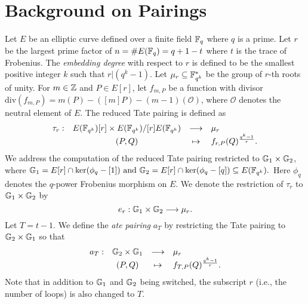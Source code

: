 \section{Background on Pairings}
\label{sec:background}

Let $E$ be an elliptic curve defined over a finite field $\mathbb{F}_{q}$ where $q$ is a prime.
Let $r$ be the largest prime factor of $n = \#E(\mathbb{F}_{q}) = q + 1 - t$ where $t$ is the trace of Frobenius.
The \emph{embedding degree} with respect to $r$ is defined to be the smallest positive integer $k$ such that $r | (q^k-1)$.
Let $\mu_{r} \subseteq \mathbb{F}_{q^{k}}^{*}$ be the group of $r$-th roots of unity.
For $m \in \mathbb{Z}$ and $P \in E[r]$,
let $f_{m,P}$ be a function with divisor 
$\text{div}(f_{m,P}) = m(P) - ([m]P) - (m-1)(\mathcal{O})$,
where $\mathcal{O}$ denotes the neutral element of $E$.
The reduced Tate pairing is defined as
\[\begin{array}{rccl}
\tau_{r} :	& E(\mathbb{F}_{q^{k}})[r] \times E(\mathbb{F}_{q^{k}})/[r]E(\mathbb{F}_{q^{k}})	& \longrightarrow	& \mu_{r} \\
		& (P,Q)								& \mapsto		& f_{r,P}(Q)^{\frac{q^{k}-1}{r}}.
\end{array}\]
We address the computation of the reduced Tate pairing restricted to $\mathbb{G}_{1} \times \mathbb{G}_{2}$, where
$\mathbb{G}_{1} = E[r] \cap \ker(\phi_{q}-[1]) \text{ and }
\mathbb{G}_{2} = E[r] \cap \ker(\phi_{q} - [q]) \subseteq E(\mathbb{F}_{q^{k}}).$
Here $\phi_{q}$ denotes the $q$-power Frobenius morphism on $E$.
We denote the restriction of $\tau_{r}$ to $\mathbb{G}_{1} \times \mathbb{G}_{2}$ by
$$e_{r} : \mathbb{G}_{1} \times \mathbb{G}_{2} \longrightarrow \mu_{r}.$$
Let $T = t-1$.
We define the \emph{ate pairing} $a_{T}$ by restricting the Tate pairing to $\mathbb{G}_{2} \times \mathbb{G}_{1}$ so that
\[\begin{array}{rccl}
a_{T} :	& \mathbb{G}_{2} \times \mathbb{G}_{1}	& \longrightarrow	& \mu_{r} \\
	& (P,Q) 		& \mapsto		& f_{T,P}(Q)^{\frac{q^{k}-1}{r}}.
\end{array}\]
Note that in addition to $\mathbb{G}_{1}$ and $\mathbb{G}_{2}$ being switched, the subscript $r$ (i.e., the number of loops) is also changed to $T$.


